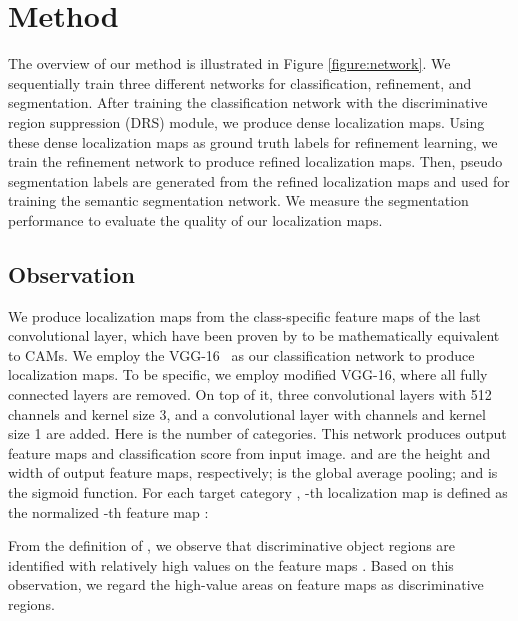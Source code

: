 \documentclass[letterpaper]{article} \usepackage{aaai21}  \usepackage{times}  \usepackage{helvet} \usepackage{courier}  \usepackage[hyphens]{url}  \usepackage{graphicx} \urlstyle{rm} \def\UrlFont{\rm}  \usepackage{natbib}  \usepackage{caption} \frenchspacing  \setlength{\pdfpagewidth}{8.5in}  \setlength{\pdfpageheight}{11in}
\begin{document}
\section{Method}

The overview of our method is illustrated in Figure \ref{figure:network}.
We sequentially train three different networks for classification, refinement, and segmentation.
After training the classification network with the discriminative region suppression (DRS) module, we produce dense localization maps.
Using these dense localization maps as ground truth labels for refinement learning, we train the refinement network to produce refined localization maps.
Then, pseudo segmentation labels are generated from the refined localization maps and used for training the semantic segmentation network.
We measure the segmentation performance to evaluate the quality of our localization maps.


\subsection{Observation}
\label{method:1}
We produce localization maps from the class-specific feature maps of the last convolutional layer, which have been proven by \cite{zhang2018adversarial} to be mathematically equivalent to CAMs.
We employ the VGG-16~\cite{simonyan2014very} as our classification network to produce localization maps.
To be specific, we employ modified VGG-16, where all fully connected layers are removed. On top of it, three convolutional layers with 512 channels and kernel size 3, and a convolutional layer with  channels and kernel size 1 are added. Here  is the number of categories.
This network produces output feature maps  and classification score  from input image. 
 and  are the height and width of output feature maps, respectively;  is the global average pooling; and  is the sigmoid function.
For each target category , -th localization map  is defined as the normalized -th feature map :


From the definition of , we observe that discriminative object regions are identified with relatively high values on the feature maps .
Based on this observation, we regard the high-value areas on feature maps as discriminative regions.
\end{document}
